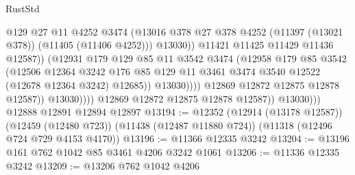 \begin{lexlean}{RustStd}
\begin{coremodule}
                                        @129
                                        @27
                                        @11
                                        @4252
                                        @3474
                                        (@13016
                                          @378
                                          @27
                                          @378
                                          @4252
                                          (@11397 (@13021 @378))
                                          (@11405 (@11406 @4252)))
                                        @13030))
                                    @11421
                                    @11425
                                    @11429
                                    @11436
                                    @12587))
                                (@12931
                                  @179
                                  @129
                                  @85
                                  @11
                                  @3542
                                  @3474
                                  (@12958
                                    @179
                                    @85
                                    @3542
                                    (@12506
                                      @12364
                                      @3242
                                      @176
                                      @85
                                      @129
                                      @11
                                      @3461
                                      @3474
                                      @3540
                                      @12522
                                      (@12678 @12364 @3242)
                                      @12685))
                                  @13030))))
                          @12869
                          @12872
                          @12875
                          @12878
                          @12587))
                      @13030))))
              @12869
              @12872
              @12875
              @12878
              @12587))
          @13030)))
    @12888
    @12891
    @12894
    @12897
@13194 := @12352
    (@12914 (@13178 @12587))
    (@12459 (@12480 @723))
    (@11438 (@12487 @11880 @724))
    (@11318 (@12496 @724 @729 @4153 @4170))
@13196 := @11366 @12335 @3242
@13204 := @13196 @161 @762 @1042 @85 @3461 @4206 @3242 @1061
@13206 := @11336 @12335 @3242
@13209 := @13206 @762 @1042 @4206

\end{coremodule}
\end{lexlean}

